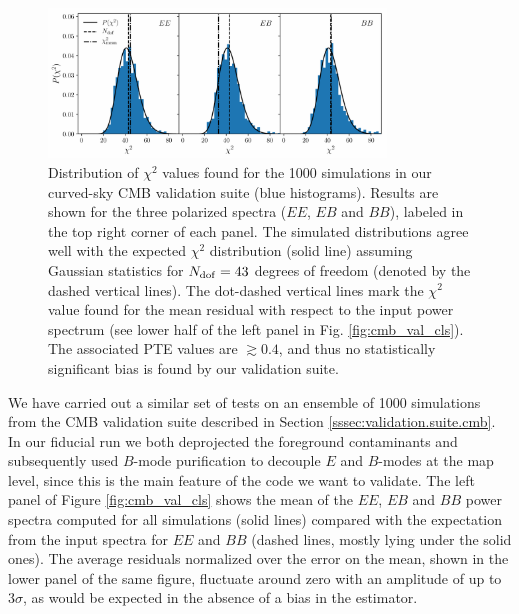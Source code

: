 \documentclass[usenatbib]{mnrasb}
\begin{document}
      \begin{figure}
        \centering
        \includegraphics[width=0.80\textwidth]{val_chi2_cmb_sph}
        \caption{Distribution of $\chi^2$ values found for the 1000 simulations in our curved-sky CMB validation suite (blue histograms). Results are shown for the three polarized spectra ($EE$, $EB$ and $BB$), labeled in the top right corner of each panel. The simulated distributions agree well with the expected $\chi^2$ distribution (solid line) assuming Gaussian statistics for $N_{\rm dof}=43$ degrees of freedom (denoted by the dashed vertical lines). The dot-dashed vertical lines mark the $\chi^2$ value found for the mean residual with respect to the input power spectrum (see lower half of the left panel in Fig. \ref{fig:cmb_val_cls}). The associated PTE values are $\gtrsim0.4$, and thus no statistically significant bias is found by our validation suite.} \label{fig:cmb_val_chi2}
      \end{figure}
      We have carried out a similar set of tests on an ensemble of 1000 simulations from the CMB validation suite described in Section \ref{sssec:validation.suite.cmb}. In our fiducial run we both deprojected the foreground contaminants and subsequently used $B$-mode purification to decouple $E$ and $B$-modes at the map level, since this is the main feature of the code we want to validate. The left panel of Figure \ref{fig:cmb_val_cls} shows the mean of the $EE$, $EB$ and $BB$ power spectra computed for all simulations (solid lines) compared with the expectation from the input spectra for $EE$ and $BB$ (dashed lines, mostly lying under the solid ones). The average residuals normalized over the error on the mean, shown in the lower panel of the same figure, fluctuate around zero with an amplitude of up to $3\sigma$, as would be expected in the absence of a bias in the estimator. 
\end{document}
